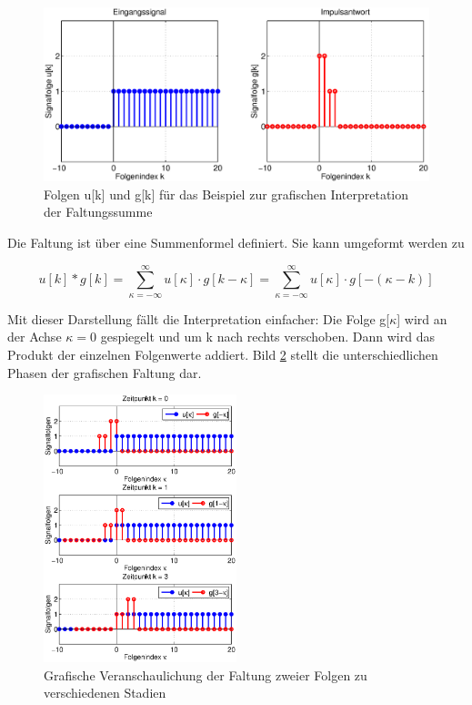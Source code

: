 \begin{figure}[H]
  \centerline{\includegraphics[width=1\textwidth]{Kapitel4/Bilder/image14.eps}}
  \caption{Folgen u[k] und g[k] f\"{u}r das Beispiel zur grafischen Interpretation der Faltungssumme}
  \label{fig:GrafischeFaltung}
\end{figure}

\noindent Die Faltung ist über eine Summenformel definiert. Sie kann umgeformt werden zu

\begin{equation}\label{eq:fourninetyone}
u\left[k\right]*g\left[k\right]=\sum _{\kappa =-\infty }^{\infty }u\left[\kappa \right]\cdot g\left[k-\kappa \right] =\sum _{\kappa =-\infty }^{\infty }u\left[\kappa \right]\cdot g\left[-(\kappa -k)\right] 
\end{equation}

\noindent Mit dieser Darstellung f\"{a}llt die Interpretation einfacher: Die Folge g[$\kappa$] wird an der Achse $\kappa = 0$ gespiegelt und um k nach rechts verschoben. Dann wird das Produkt der einzelnen Folgenwerte addiert. Bild \ref{fig:GrafischeFaltung1} stellt die unterschiedlichen Phasen der grafischen Faltung dar.

\clearpage

\begin{figure}[H]
  \centerline{\includegraphics[width=0.5\textwidth]{Kapitel4/Bilder/image15.eps}}
  \caption{Grafische Veranschaulichung der Faltung zweier Folgen zu verschiedenen Stadien}
  \label{fig:GrafischeFaltung1}
\end{figure}

